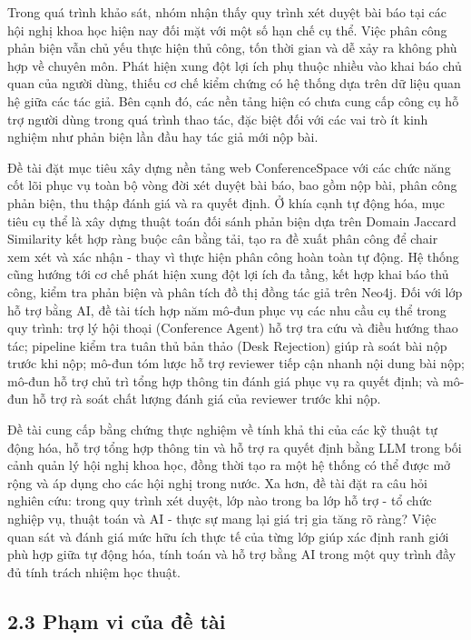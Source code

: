 Trong quá trình khảo sát, nhóm nhận thấy quy trình xét duyệt bài báo tại các hội nghị khoa học hiện nay đối mặt với một số hạn chế cụ thể. Việc phân công phản biện vẫn chủ yếu thực hiện thủ công, tốn thời gian và dễ xảy ra không phù hợp về chuyên môn. Phát hiện xung đột lợi ích phụ thuộc nhiều vào khai báo chủ quan của người dùng, thiếu cơ chế kiểm chứng có hệ thống dựa trên dữ liệu quan hệ giữa các tác giả. Bên cạnh đó, các nền tảng hiện có chưa cung cấp công cụ hỗ trợ người dùng trong quá trình thao tác, đặc biệt đối với các vai trò ít kinh nghiệm như phản biện lần đầu hay tác giả mới nộp bài.

Đề tài đặt mục tiêu xây dựng nền tảng web ConferenceSpace với các chức năng cốt lõi phục vụ toàn bộ vòng đời xét duyệt bài báo, bao gồm nộp bài, phân công phản biện, thu thập đánh giá và ra quyết định. Ở khía cạnh tự động hóa, mục tiêu cụ thể là xây dựng thuật toán đối sánh phản biện dựa trên Domain Jaccard Similarity kết hợp ràng buộc cân bằng tải, tạo ra đề xuất phân công để chair xem xét và xác nhận - thay vì thực hiện phân công hoàn toàn tự động. Hệ thống cũng hướng tới cơ chế phát hiện xung đột lợi ích đa tầng, kết hợp khai báo thủ công, kiểm tra phản biện và phân tích đồ thị đồng tác giả trên Neo4j. Đối với lớp hỗ trợ bằng AI, đề tài tích hợp năm mô-đun phục vụ các nhu cầu cụ thể trong quy trình: trợ lý hội thoại (Conference Agent) hỗ trợ tra cứu và điều hướng thao tác; pipeline kiểm tra tuân thủ bản thảo (Desk Rejection) giúp rà soát bài nộp trước khi nộp; mô-đun tóm lược hỗ trợ reviewer tiếp cận nhanh nội dung bài nộp; mô-đun hỗ trợ chủ trì tổng hợp thông tin đánh giá phục vụ ra quyết định; và mô-đun hỗ trợ rà soát chất lượng đánh giá của reviewer trước khi nộp.

Đề tài cung cấp bằng chứng thực nghiệm về tính khả thi của các kỹ thuật tự động hóa, hỗ trợ tổng hợp thông tin và hỗ trợ ra quyết định bằng LLM trong bối cảnh quản lý hội nghị khoa học, đồng thời tạo ra một hệ thống có thể được mở rộng và áp dụng cho các hội nghị trong nước. Xa hơn, đề tài đặt ra câu hỏi nghiên cứu: trong quy trình xét duyệt, lớp nào trong ba lớp hỗ trợ - tổ chức nghiệp vụ, thuật toán và AI - thực sự mang lại giá trị gia tăng rõ ràng? Việc quan sát và đánh giá mức hữu ích thực tế của từng lớp giúp xác định ranh giới phù hợp giữa tự động hóa, tính toán và hỗ trợ bằng AI trong một quy trình đầy đủ tính trách nhiệm học thuật.

\subsection*{2.3 Phạm vi của đề tài}

